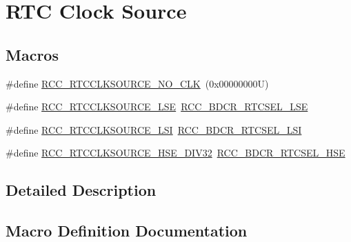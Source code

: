 \hypertarget{group___r_c_c___r_t_c___clock___source}{}\section{R\+TC Clock Source}
\label{group___r_c_c___r_t_c___clock___source}
\subsection*{Macros}
\begin{DoxyCompactItemize}
\item 
\#define \hyperlink{group___r_c_c___r_t_c___clock___source_gacce0b2f54d103340d8c3a218e86e295d}{R\+C\+C\+\_\+\+R\+T\+C\+C\+L\+K\+S\+O\+U\+R\+C\+E\+\_\+\+N\+O\+\_\+\+C\+LK}~(0x00000000\+U)
\item 
\#define \hyperlink{group___r_c_c___r_t_c___clock___source_ga5dca8d63f250a20bd6bc005670d0c150}{R\+C\+C\+\_\+\+R\+T\+C\+C\+L\+K\+S\+O\+U\+R\+C\+E\+\_\+\+L\+SE}~\hyperlink{group___peripheral___registers___bits___definition_ga07f6cd2e581dabf6d442145603033205}{R\+C\+C\+\_\+\+B\+D\+C\+R\+\_\+\+R\+T\+C\+S\+E\+L\+\_\+\+L\+SE}
\item 
\#define \hyperlink{group___r_c_c___r_t_c___clock___source_gab47a1afb8b5eef9f20f4772961d0a5f4}{R\+C\+C\+\_\+\+R\+T\+C\+C\+L\+K\+S\+O\+U\+R\+C\+E\+\_\+\+L\+SI}~\hyperlink{group___peripheral___registers___bits___definition_ga66773d3ffb98fb0c7a72e39a224f1cfd}{R\+C\+C\+\_\+\+B\+D\+C\+R\+\_\+\+R\+T\+C\+S\+E\+L\+\_\+\+L\+SI}
\item 
\#define \hyperlink{group___r_c_c___r_t_c___clock___source_ga070b819c6eca00d4b89cbf35216c3a92}{R\+C\+C\+\_\+\+R\+T\+C\+C\+L\+K\+S\+O\+U\+R\+C\+E\+\_\+\+H\+S\+E\+\_\+\+D\+I\+V32}~\hyperlink{group___peripheral___registers___bits___definition_gac9db61bfa161573b4225c147d4ea0c3e}{R\+C\+C\+\_\+\+B\+D\+C\+R\+\_\+\+R\+T\+C\+S\+E\+L\+\_\+\+H\+SE}
\end{DoxyCompactItemize}


\subsection{Detailed Description}


\subsection{Macro Definition Documentation}
\mbox{\label{group___r_c_c___r_t_c___clock___source_ga070b819c6eca00d4b89cbf35216c3a92}} 
